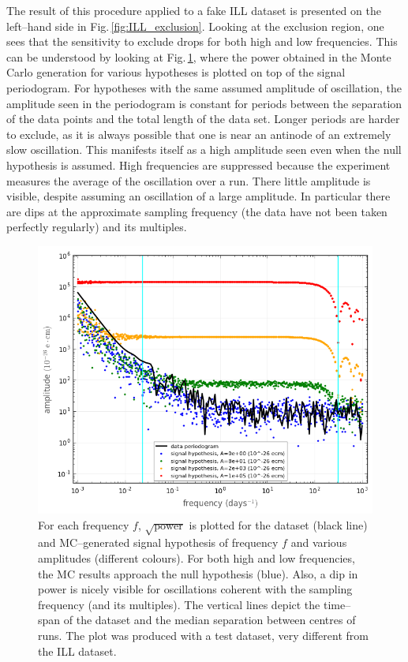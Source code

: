 The result of this procedure applied to a fake ILL dataset is presented on the left--hand side in Fig.\,\ref{fig:ILL_exclusion}. Looking at the exclusion region, one sees that the sensitivity to exclude drops for both high and low frequencies. This can be understood by looking at Fig.\,\ref{fig:sensitivity}, where the power obtained in the Monte Carlo generation for various hypotheses is plotted on top of the signal periodogram. For hypotheses with the same assumed amplitude of oscillation, the amplitude seen in the periodogram is constant for periods between the separation of the data points and the total length of the data set. Longer periods are harder to exclude, as it is always possible that one is near an antinode of an extremely slow oscillation. This manifests itself as a high amplitude seen even when the null hypothesis is assumed. High frequencies are suppressed because the experiment measures the average of the oscillation over a run. There little amplitude is visible, despite assuming an oscillation of a large amplitude. In particular there are dips at the approximate sampling frequency (the data have not been taken perfectly regularly) and its multiples.

\begin{figure}[htb]
  \centering \includegraphics[width=\linewidth]{gfx/axions/sensitivity.png}
  \caption{For each frequency $f$, $\sqrt{\text{power}}$ is plotted for the dataset (black line) and MC--generated signal hypothesis of frequency $f$ and various amplitudes (different colours). For both high and low frequencies, the MC results approach the null hypothesis (blue). Also, a dip in power is nicely visible for oscillations coherent with the sampling frequency (and its multiples). The vertical lines depict the time--span of the dataset and the median separation between centres of runs.  The plot was produced with a test dataset, very different from the ILL dataset. }
  \label{fig:sensitivity}
\end{figure}

